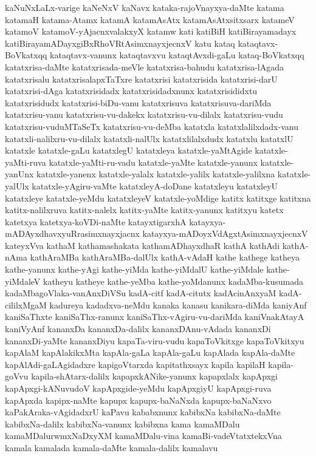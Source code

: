 {kaNuNxLaLx-varige
kaNeNxV
kaNavx
kataka-rajoVnayxya-daMte
katama
katamaH
katama-Atamx
katamA
katamAsAtx
katamAsAtxsitxsarx
katameV
katamoV
katamoV-yAjacnxvalakxyX
katamw
kati
katiBiH
katiBirayamadayx
katiBirayamADayxgiBxRhoVRtAsimxnayxjecnxV
katu
kataq
kataqtavx-BoVkatxqq
kataqtavx-vanunx
kataqtavxvu
kataqtAvxdi-gaLu
kataq-BoVkatxqq
katatxrisa-daMte
katatxrisada-meVle
katatxrisa-bahudu
katatxrisa-lAgada
katatxrisalu
katatxrisalapxTaTxre
katatxrisi
katatxrisida
katatxrisi-darU
katatxrisi-dAga
katatxrisidadx
katatxrisidadxnunx
katatxrisididxtu
katatxrisidudx
katatxrisi-biDu-vanu
katatxrisuva
katatxrisuva-dariMda
katatxrisu-vanu
katatxrisu-vu-dakekx
katatxrisu-vu-dilalx
katatxrisu-vudu
katatxrisu-vuduMTaSeTx
katatxrisu-vu-deMba
katatxla
katatxlalilxdadx-vanu
katatxli-nalilxru-vu-dilalx
katatxli-nalUlx
katatxlilalxdudx
katatxlu
katatxlU
katatxle
katatxle-gaLu
katatxlegU
katatxleya
katatxle-yaMtAgide
katatxle-yaMti-ruva
katatxle-yaMti-ru-vadu
katatxle-yaMte
katatxle-yanunx
katatxle-yanUnx
katatxle-yanenx
katatxle-yalalx
katatxle-yalilx
katatxle-yalilxna
katatxle-yalUlx
katatxle-yAgiru-vaMte
katatxleyA-doDane
katatxleyu
katatxleyU
katatxleye
katatxle-yeMdu
katatxleyeV
katatxle-yoMdige
katitx
katitxge
katitxna
katitx-nalilxruva
katitx-nalelx
katitx-yaMte
katitx-yanunx
katitxyu
katetx
katetxya
katetxya-koVDi-naMte
katayxtigarxhA
katayxya-mADAyxdhavxyuRrasimxnayxjacnx
katayxya-mADoyxVdAgxtAsimxnayxjecnxV
kateyxVva
kathaM
kathamashakata
kathamADhayxdhaR
kathA
kathAdi
kathA-nAma
kathAraMBa
kathAraMBa-dalUlx
kathA-vAdaH
kathe
kathege
katheya
kathe-yanunx
kathe-yAgi
kathe-yiMda
kathe-yiMdalU
kathe-yiMdale
kathe-yiMdaleV
katheyu
katheye
kathe-yeMba
kathe-yoMdanunx
kadaMba-kusumada
kadaMbagoVlaka-vanAnxDiVSu
kadA-citf
kadA-citutx
kadAcinAnxyaM
kadA-cililxMgaM
kadureya
kadadxva-neMdu
kanaka
kanasu
kanikara-diMda
kaniyAnf
kaniSaThxte
kaniSaThx-ranunx
kaniSaThx-vAgiru-vu-dariMda
kaniVnakAtayA
kaniVyAnf
kananxDa
kananxDa-dalilx
kananxDAnu-vAdada
kananxDi
kananxDi-yaMte
kananxDiyu
kapaTa-viru-vudu
kapaToVkitxge
kapaToVkitxyu
kapAlaM
kapAlakikxMta
kapAla-gaLa
kapAla-gaLu
kapAlada
kapAla-daMte
kapAlAdi-gaLAgidadxre
kapigoVtarxda
kapitathxsayx
kapila
kapilaH
kapila-goVvu
kapila-shAtarx-dalilx
kapapxkANike-yanunx
kapapxlalx
kapApxgi
kapApxgi-kANuvudoV
kapApxgide-yeMdu
kapApxgiyU
kapApxgi-ruva
kapApxda
kapipx-naMte
kapupx
kapupx-baNaNxda
kapupx-baNaNxvo
kaPakAraka-vAgidadxrU
kaPavu
kababxnunx
kabibxNa
kabibxNa-daMte
kabibxNa-dalilx
kabibxNa-vanunx
kabibxna
kama
kamaMDalu
kamaMDalurwmxNaDxyXM
kamaMDalu-vina
kamaBi-vadeVtatxtekxVna
kamala
kamalada
kamala-daMte
kamala-dalilx
kamalavu
}
